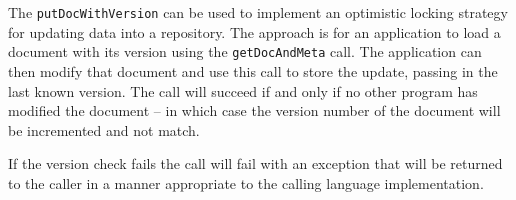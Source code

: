 The \verb+putDocWithVersion+ can be used to implement an optimistic locking
strategy for updating data into a repository. The approach is for an application
to load a document with its version using the \verb+getDocAndMeta+ call. The
application can then modify that document and use this call to store the
update, passing in the last known version. The call will succeed if and only if
no other program has modified the document -- in which case the version number
of the document will be incremented and not match.

If the version check fails the call will fail with an exception that will be
returned to the caller in a manner appropriate to the calling language implementation.
